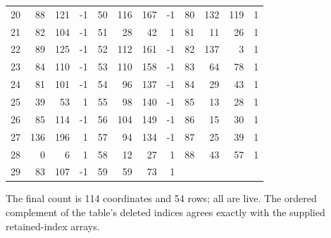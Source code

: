 \begin{center}
\begin{tabular}{@{}rrrr@{\quad}rrrr@{\quad}rrrr@{}}
20 & 88 & 121 & -1 & 50 & 116 & 167 & -1 & 80 & 132 & 119 & 1\\
21 & 82 & 104 & -1 & 51 & 28 & 42 & 1 & 81 & 11 & 26 & 1\\
22 & 89 & 125 & -1 & 52 & 112 & 161 & -1 & 82 & 137 & 3 & 1\\
23 & 84 & 110 & -1 & 53 & 110 & 158 & -1 & 83 & 64 & 78 & 1\\
24 & 81 & 101 & -1 & 54 & 96 & 137 & -1 & 84 & 29 & 43 & 1\\
25 & 39 & 53 & 1 & 55 & 98 & 140 & -1 & 85 & 13 & 28 & 1\\
26 & 85 & 114 & -1 & 56 & 104 & 149 & -1 & 86 & 15 & 30 & 1\\
27 & 136 & 196 & 1 & 57 & 94 & 134 & -1 & 87 & 25 & 39 & 1\\
28 & 0 & 6 & 1 & 58 & 12 & 27 & 1 & 88 & 43 & 57 & 1\\
29 & 83 & 107 & -1 & 59 & 59 & 73 & 1 &  &  &  & \\
\bottomrule\end{tabular}\end{center}
The final count is 114 coordinates and 54 rows; all are live. The ordered complement of the table's deleted indices agrees exactly with the supplied retained-index arrays.
